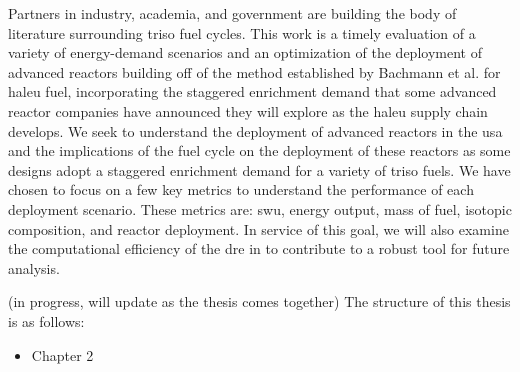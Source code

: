 Partners in industry, academia, and government are building the body of
literature surrounding \gls{triso} fuel cycles. This work is a timely
evaluation of a variety of energy-demand scenarios and an optimization of the
deployment of advanced reactors building off of the method established by
Bachmann et al. \cite{bachmann_enrichment_2021} for \gls{haleu} fuel,
incorporating the staggered enrichment demand that some advanced reactor
companies have announced they will explore as the \gls{haleu} supply chain
develops. We seek to understand the deployment of advanced reactors in the
\gls{usa} and the implications of the fuel cycle on the deployment of these
reactors as some designs adopt a staggered enrichment demand for a variety of
\gls{triso} fuels. We have chosen to focus on a few key metrics to understand
the performance of each deployment scenario. These metrics are: \gls{swu},
energy output, mass of fuel, isotopic composition, and reactor deployment. In
service of this goal, we will also examine the computational efficiency of the
\gls{dre} in \cyclus to contribute to a robust tool for future analysis.


\pagebreak

(in progress, will update as the thesis comes together)
The structure of this thesis is as follows:

\begin{itemize}
    \item Chapter 2
\end{itemize}